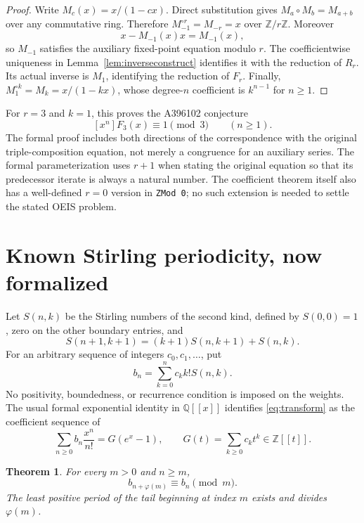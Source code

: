 \documentclass[11pt,a4paper]{article}
\newtheorem{theorem}{Theorem}[section]
\theoremstyle{remark}
\newcommand{\Z}{\mathbb Z}
\newcommand{\Q}{\mathbb Q}
\begin{document}
\begin{proof}
Write $M_c(x)=x/(1-cx)$. Direct substitution gives
$M_a\circ M_b=M_{a+b}$ over any commutative ring. Therefore
$M_{-1}^{\circ r}=M_{-r}=x$ over $\Z/r\Z$. Moreover
\[
x-M_{-1}(x)x=M_{-1}(x),
\]
so $M_{-1}$ satisfies the auxiliary fixed-point equation modulo $r$.
The coefficientwise uniqueness in Lemma~\ref{lem:inverseconstruct}
identifies it with the reduction of $R_r$. Its actual inverse is
$M_1$, identifying the reduction of $F_r$. Finally,
$M_1^{\circ k}=M_k=x/(1-kx)$, whose degree-$n$ coefficient is
$k^{n-1}$ for $n\ge1$.
\end{proof}

For $r=3$ and $k=1$, this proves the A396102 conjecture
\[
[x^n]F_3(x)\equiv1\pmod3\qquad(n\ge1).
\]
The formal proof includes both directions of the correspondence with
the original triple-composition equation, not merely a congruence for
an auxiliary series. The formal parameterization uses $r+1$ when
stating the original equation so that its predecessor iterate is
always a natural number. The coefficient theorem itself also has a
well-defined $r=0$ version in \texttt{ZMod 0}; no such extension is
needed to settle the stated OEIS problem.

\section{Known Stirling periodicity, now formalized}\label{sec:stirling}

Let $S(n,k)$ be the Stirling numbers of the second kind, defined by
$S(0,0)=1$, zero on the other boundary entries, and
\[
S(n+1,k+1)=(k+1)S(n,k+1)+S(n,k).
\]
For an arbitrary sequence of integers $c_0,c_1,\ldots$, put
\begin{equation}\label{eq:transform}
b_n=\sum_{k=0}^n c_k k!S(n,k).
\end{equation}
No positivity, boundedness, or recurrence condition is imposed on the
weights. The usual formal exponential identity in $\Q[[x]]$ identifies
\eqref{eq:transform} as the coefficient sequence of
\[
\sum_{n\ge0}b_n\frac{x^n}{n!}=G(e^x-1),\qquad
G(t)=\sum_{k\ge0}c_kt^k\in\Z[[t]].
\]

\begin{theorem}\label{thm:stirling}
For every $m>0$ and $n\ge m$,
\[
b_{n+\varphi(m)}\equiv b_n\pmod m.
\]
The least positive period of the tail beginning at index $m$ exists
and divides $\varphi(m)$.
\end{theorem}
\end{document}
